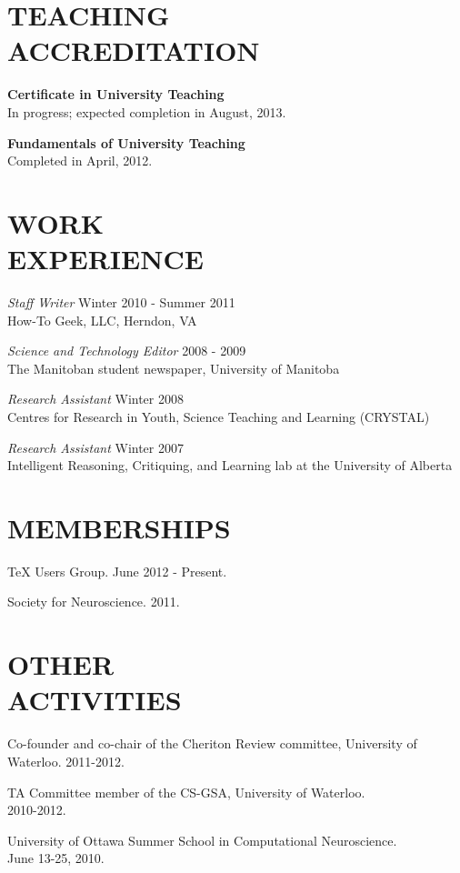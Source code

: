 \documentclass[line,margin]{res}
\begin{document}
\begin{resume}
\section{TEACHING \\ACCREDITATION}
  {\bf Certificate in University Teaching} \\
  In progress; expected completion in August, 2013.

  {\bf Fundamentals of University Teaching} \\
  Completed in April, 2012.

\section{WORK \\EXPERIENCE}
  {\sl Staff Writer} \hfill Winter 2010 - Summer 2011 \\
  How-To Geek, LLC, Herndon, VA
  
  {\sl Science and Technology Editor} \hfill 2008 - 2009 \\
  The Manitoban student newspaper, University of Manitoba
  
  {\sl Research Assistant} \hfill Winter 2008 \\
  Centres for Research in Youth, Science Teaching and Learning (CRYSTAL)
  
  {\sl Research Assistant} \hfill Winter 2007 \\
  Intelligent Reasoning, Critiquing, and Learning lab at the University of Alberta

\section{MEMBERSHIPS}
  TeX Users Group. June 2012 - Present.
  
  	Society for Neuroscience. 2011.

\section{OTHER \\ ACTIVITIES}
  Co-founder and co-chair of the Cheriton Review committee,
  University of Waterloo. 2011-2012.

  TA Committee member of the CS-GSA, University of Waterloo. \\
  2010-2012.

  University of Ottawa Summer School in Computational Neuroscience. \\
  June 13-25, 2010.


\end{resume}
\end{document}
